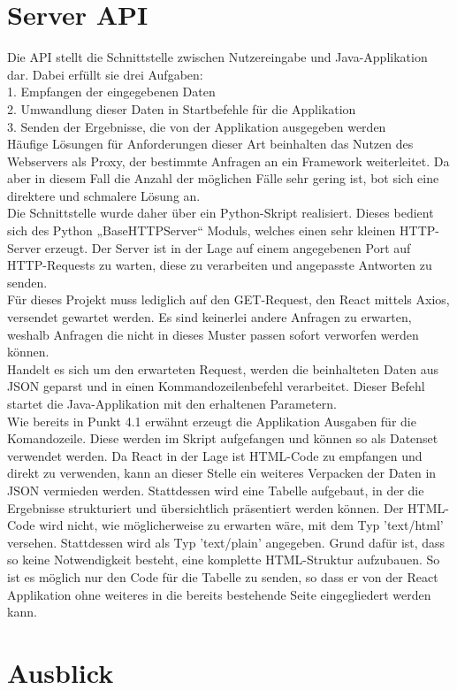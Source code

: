 \section{Server API}
Die API stellt die Schnittstelle zwischen Nutzereingabe und Java-Applikation dar. Dabei erfüllt sie drei Aufgaben: \\ 
1. Empfangen der eingegebenen Daten \\ 
2. Umwandlung dieser Daten in Startbefehle für die Applikation\\
3. Senden der Ergebnisse, die von der Applikation ausgegeben werden\\ 
Häufige Lösungen für Anforderungen dieser Art beinhalten das Nutzen des Webservers als Proxy, der bestimmte Anfragen an ein Framework weiterleitet. Da aber in diesem Fall die Anzahl der möglichen Fälle sehr gering ist, bot sich eine direktere und schmalere Lösung an.\\
Die Schnittstelle wurde daher über ein Python-Skript realisiert. Dieses bedient sich des Python „BaseHTTPServer“ Moduls, welches einen sehr kleinen HTTP-Server erzeugt. Der Server ist in der Lage auf einem angegebenen Port auf HTTP-Requests zu warten, diese zu verarbeiten und angepasste Antworten zu senden. \\
Für dieses Projekt muss lediglich auf den GET-Request, den React mittels Axios, versendet gewartet werden. Es sind keinerlei andere Anfragen zu erwarten, weshalb Anfragen die nicht in dieses Muster passen sofort verworfen werden können.\\
Handelt es sich um den erwarteten Request, werden die beinhalteten Daten aus JSON geparst und in einen Kommandozeilenbefehl verarbeitet. Dieser Befehl startet die Java-Applikation mit den erhaltenen Parametern.\\
Wie bereits in Punkt 4.1 erwähnt erzeugt die Applikation Ausgaben für die Komandozeile. Diese werden im Skript aufgefangen und können so als Datenset verwendet werden. Da React in der Lage ist HTML-Code zu empfangen und direkt zu verwenden, kann an dieser Stelle ein weiteres Verpacken der Daten in JSON vermieden werden. Stattdessen wird eine Tabelle aufgebaut, in der die Ergebnisse strukturiert und übersichtlich präsentiert werden können. Der HTML-Code wird nicht, wie möglicherweise zu erwarten wäre, mit dem Typ 'text/html' versehen. Stattdessen wird als Typ 'text/plain' angegeben. Grund dafür ist, dass so keine Notwendigkeit besteht, eine komplette HTML-Struktur aufzubauen. So ist es möglich nur den Code für die Tabelle zu senden, so dass er von der React Applikation ohne weiteres in die bereits bestehende Seite eingegliedert werden kann.
\section{Ausblick}
